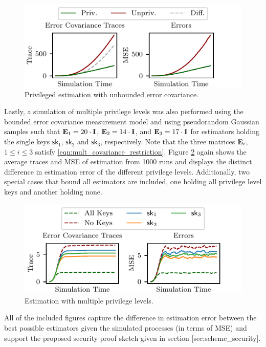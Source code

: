 \begin{figure}[htbp]
   \centering
   \includegraphics{figures/single_level_unbounded.pdf}
   \caption{Privileged estimation with unbounded error covariance.}
   \label{fig:single_unbounded}
\end{figure}

Lastly, a simulation of multiple privilege levels was also performed using the bounded error covariance measurement model and using pseudorandom Gaussian samples such that ${{\mathbf{E}}}_1=20 \cdot {\ensuremath{{\mathbf{I}}}}$, ${{\mathbf{E}}}_2=14 \cdot {\ensuremath{{\mathbf{I}}}}$, and ${{\mathbf{E}}}_3=17 \cdot {\ensuremath{{\mathbf{I}}}}$ for estimators holding the single keys $\mathsf{sk}_1$, $\mathsf{sk}_2$ and $\mathsf{sk}_3$, respectively. Note that the three matrices ${{\mathbf{E}}}_i$, $1 \leq i \leq 3$ satisfy \eqref{eqn:mult_covariance_restriction}. Figure \ref{fig:multiple_bounded} again shows the average traces and MSE of estimation from 1000 runs and displays the distinct difference in estimation error of the different privilege levels. Additionally, two special cases that bound all estimators are included, one holding all privilege level keys and another holding none.

\begin{figure}[htbp]
   \centering
   \includegraphics{figures/multiple_level.pdf}
   \caption{Estimation with multiple privilege levels.}
   \label{fig:multiple_bounded}
\end{figure}

All of the included figures capture the difference in estimation error between the best possible estimators given the simulated processes (in terms of MSE) and support the proposed security proof sketch given in section [sec:scheme\_security].


